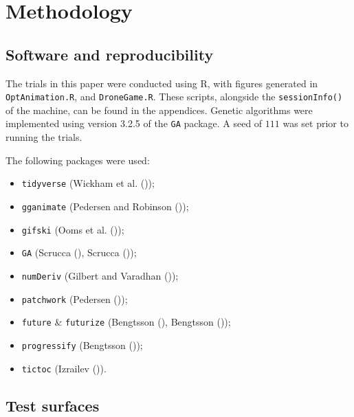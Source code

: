 \documentclass[
  a4paper,
]{article}
\providecommand{\tightlist}{%
  \setlength{\itemsep}{0pt}\setlength{\parskip}{0pt}}\usepackage{longtable,booktabs,array}
\newcommand{\+}{\phantom{-}}
\begin{document}
\newpage

\section{Methodology}\label{methodology}

\subsection{Software and
reproducibility}\label{software-and-reproducibility}

The trials in this paper were conducted using R, with figures generated
in \texttt{OptAnimation.R}, and \texttt{DroneGame.R}. These scripts,
alongside the \texttt{sessionInfo()} of the machine, can be found in the
appendices. Genetic algorithms were implemented using version 3.2.5 of
the \texttt{GA} package. A seed of \(111\) was set prior to running the
trials.

The following packages were used:

\begin{itemize}
\tightlist
\item
  \texttt{tidyverse} (Wickham et al. ());
\item
  \texttt{gganimate} (Pedersen and Robinson
  ());
\item
  \texttt{gifski} (Ooms et al. ());
\item
  \texttt{GA} (Scrucca (), Scrucca
  ());
\item
  \texttt{numDeriv} (Gilbert and Varadhan
  ());
\item
  \texttt{patchwork} (Pedersen ());
\item
  \texttt{future} \& \texttt{futurize} (Bengtsson
  (), Bengtsson
  ());
\item
  \texttt{progressify} (Bengtsson ());
\item
  \texttt{tictoc} (Izrailev ()).
\end{itemize}

\subsection{Test surfaces}\label{test-surfaces}
\end{document}
